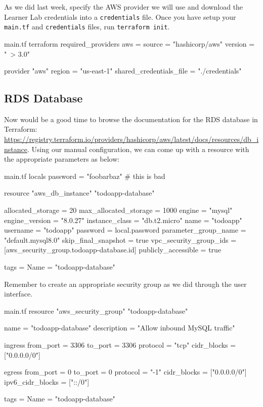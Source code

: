 \documentclass{csse4400}
\begin{document}
As we did last week,
specify the AWS provider we will use and download the Learner Lab credentials into a \texttt{credentials} file.
Once you have setup your \texttt{main.tf} and \texttt{credentials} files, run \lstinline{terraform init}.

\begin{code}[language=terraform]{main.tf}
terraform {
  required_providers {
    aws = {
      source = "hashicorp/aws"
      version = "~> 3.0"
    }
  }
}

provider "aws" {
  region = "us-east-1"
  shared_credentials_file = "./credentials"
}
\end{code}

\subsection{RDS Database}

Now would be a good time to browse the documentation for the RDS database in Terraform:
\url{https://registry.terraform.io/providers/hashicorp/aws/latest/docs/resources/db_instance}.
Using our manual configuration,
we can come up with a resource with the appropriate parameters as below:

\begin{code}[language=terraform]{main.tf}
locals {
  password = "foobarbaz" # this is bad
}

resource "aws_db_instance" "todoapp-database" {
  allocated_storage      = 20
  max_allocated_storage  = 1000
  engine                 = "mysql"
  engine_version         = "8.0.27"
  instance_class         = "db.t2.micro"
  name                   = "todoapp"
  username               = "todoapp"
  password               = local.password
  parameter_group_name   = "default.mysql8.0"
  skip_final_snapshot    = true
  vpc_security_group_ids = [aws_security_group.todoapp-database.id]
  publicly_accessible    = true

  tags = {
    Name = "todoapp-database"
  }
}
\end{code}

\noindent Remember to create an appropriate security group as we did through the user interface.

\begin{code}[language=terraform]{main.tf}
resource "aws_security_group" "todoapp-database" {
  name        = "todoapp-database"
  description = "Allow inbound MySQL traffic"

  ingress {
    from_port        = 3306
    to_port          = 3306
    protocol         = "tcp"
    cidr_blocks      = ["0.0.0.0/0"]
  }

  egress {
    from_port        = 0
    to_port          = 0
    protocol         = "-1"
    cidr_blocks      = ["0.0.0.0/0"]
    ipv6_cidr_blocks = ["::/0"]
  }

  tags = {
    Name = "todoapp-database"
  }
}
\end{code}
\end{document}
